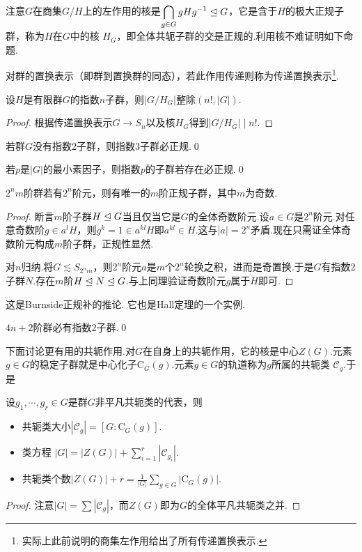 注意$G$在商集$G/H$上的左作用的核是$\displaystyle\bigcap_{g\in G}gHg^{-1}\trianglelefteq G$，它是含于$H$的极大正规子群，称为$H$在$G$中的{\heiti 核} $H_G$，即全体共轭子群的交是正规的.利用核不难证明如下命题.

对群的{\heiti 置换表示}（即群到置换群的同态），若此作用传递则称为{\heiti 传递置换表示}\footnote{实际上此前说明的商集左作用给出了所有传递置换表示.}.
\begin{thm}[(Poincar\'e)]
	设$H$是有限群$G$的指数$n$子群，则$|G/H_G|$整除$(n!,|G|)$.
\end{thm}
\begin{proof}
	根据传递置换表示$G\to S_n$以及核$H_G$得到$|G/H_G|\mid n!$.
\end{proof}
\begin{cor}
	若群$G$没有指数2子群，则指数3子群必正规.\qed
\end{cor}
\begin{cor}
	若$p$是$|G|$的最小素因子，则指数$p$的子群若存在必正规.\qed
\end{cor}

\begin{prop}
	$2^nm$阶群若有$2^n$阶元，则有唯一的$m$阶正规子群，其中$m$为奇数.
\end{prop}
\begin{proof}
	断言$m$阶子群$H\trianglelefteq G$当且仅当它是$G$的全体奇数阶元.设$a\in G$是$2^n$阶元.对任意奇数阶$g\in a^lH$，则$g^k=1\in a^{kl}H$即$a^{kl}\in H$.这与$|a|=2^n$矛盾.现在只需证全体奇数阶元构成$m$阶子群，正规性显然.

	对$n$归纳.将$G\lesssim S_{2^nm}$，则$2^n$阶元$a$是$m$个$2^n$轮换之积，进而是奇置换.于是$G$有指数2子群$N$.存在$m$阶$H\trianglelefteq N\trianglelefteq G$.与上同理验证奇数阶元$g$属于$H$即可.
\end{proof}
\begin{remark}
	这是Burnside正规补的推论.%
	它也是Hall定理的一个实例.%
\end{remark}
\begin{cor*}
	$4n+2$阶群必有指数2子群.\qed
\end{cor*}

下面讨论更有用的共轭作用.对$G$在自身上的共轭作用，它的核是中心$Z(G)$.元素$g\in G$的稳定子群就是中心化子$\mathrm{C}_G(g)$.元素$g\in G$的轨道称为$g$所属的{\heiti 共轭类} $\mathcal{C}_g$.于是
\begin{thm}
	设$g_1,\cdots,g_r\in G$是群$G$非平凡共轭类的代表，则
	\begin{itemize}
		\item 共轭类大小$|\mathcal{C}_{g}|=[G:\mathrm{C}_G(g)]$.
		\item {\heiti 类方程} $|G|=|Z(G)|+\displaystyle\sum_{i=1}^r|\mathcal{C}_{g_i}|$.
		\item 共轭类个数$|Z(G)|+r=\displaystyle\frac{1}{|G|}\sum_{g\in G}|\mathrm{C}_G(g)|$.
	\end{itemize}
\end{thm}
\begin{proof}
	注意$|G|=\displaystyle\sum|\mathcal{C}_g|$，而$Z(G)$即为$G$的全体平凡共轭类之并.
\end{proof}

